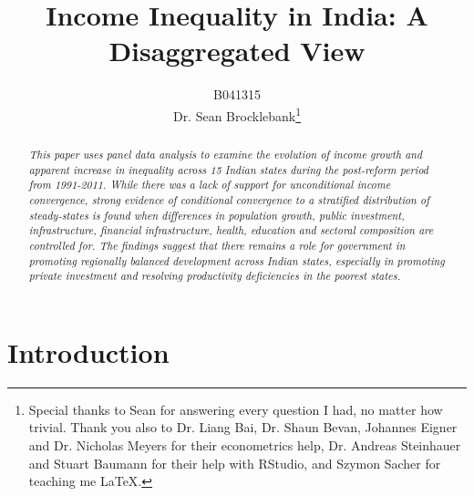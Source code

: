 \documentclass[a4paper, 11pt]{article}
\title{Income Inequality in India: A Disaggregated View}
\author{B041315\\Dr. Sean Brocklebank\thanks{Special thanks to Sean for answering every question I had, no matter how trivial.  Thank you also to Dr. Liang Bai, Dr. Shaun Bevan, Johannes Eigner and Dr. Nicholas Meyers for their econometrics help, Dr. Andreas Steinhauer and Stuart Baumann for their help with RStudio, and Szymon Sacher for teaching me LaTeX.}}
\begin{document}

\begin{titlepage}
\maketitle

\begin{abstract}
\textit{This paper uses panel data analysis to examine the evolution of income growth and apparent increase in inequality across 15 Indian states during the post-reform period from 1991-2011.  While there was a lack of support for unconditional income convergence, strong evidence of conditional convergence to a stratified distribution of steady-states is found when differences in population growth, public investment, infrastructure, financial infrastructure, health, education and sectoral composition are controlled for.  The findings suggest that there remains a role for government in promoting regionally balanced development across Indian states, especially in promoting private investment and resolving productivity deficiencies in the poorest states.}
\end{abstract}
\end{titlepage}

\section{Introduction}
\end{document}
